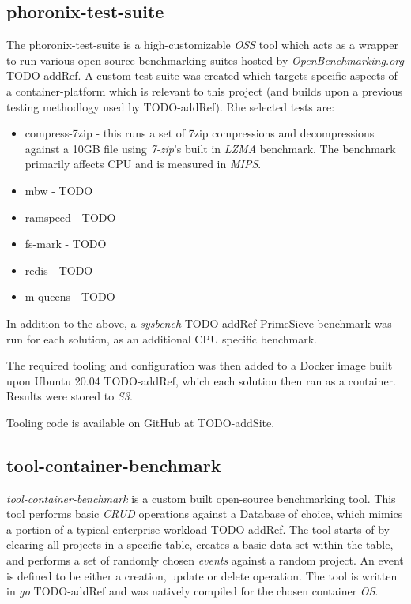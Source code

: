 \subsection{phoronix-test-suite}
The phoronix-test-suite is a high-customizable \emph{OSS} tool which acts as a wrapper to run various open-source benchmarking suites hosted by \emph{OpenBenchmarking.org} TODO-addRef.
A custom test-suite was created which targets specific aspects of a container-platform which is relevant to this project (and builds upon a previous testing methodlogy used by TODO-addRef).
Rhe selected tests are:
\begin{itemize}
  \item compress-7zip - this runs a set of 7zip compressions and decompressions against a 10GB file using \emph{7-zip}'s built in \emph{LZMA} benchmark.
        The benchmark primarily affects CPU and is measured in \emph{MIPS}.
  \item mbw - TODO
  \item ramspeed - TODO
  \item fs-mark - TODO
  \item redis - TODO
  \item m-queens - TODO
\end{itemize}
In addition to the above, a \emph{sysbench} TODO-addRef PrimeSieve benchmark was run for each solution, as an additional CPU specific benchmark.


The required tooling and configuration was then added to a Docker image built upon Ubuntu 20.04 TODO-addRef, which each solution then ran as a container.
Results were stored to \emph{S3}.

Tooling code is available on GitHub at TODO-addSite.

\subsection{tool-container-benchmark}
\textit{tool-container-benchmark} is a custom built open-source benchmarking tool. This tool performs basic \emph{CRUD} operations against a Database of choice,
which mimics a portion of a typical enterprise workload TODO-addRef. The tool starts of by clearing all projects in a specific table, creates a basic data-set within the table,
and performs a set of randomly chosen \textit{events} against a random project. An event is defined to be either a creation, update or delete operation.
The tool is written in \emph{go} TODO-addRef and was natively compiled for the chosen container \emph{OS}.

